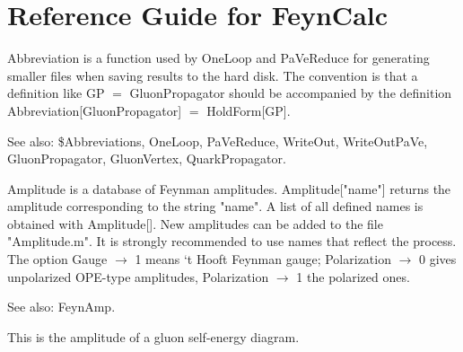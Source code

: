 \section{Reference Guide for FeynCalc}
\label{rg}
 



Abbreviation is a function used by OneLoop and PaVeReduce for generating smaller files when saving results to the hard disk. The
  convention is that a definition like GP \(=\) GluonPropagator should be accompanied by the definition Abbreviation[GluonPropagator]
  \(=\) HoldForm[GP].

See also: { }\${}Abbreviations, OneLoop, PaVeReduce, WriteOut, WriteOutPaVe, GluonPropagator, GluonVertex, QuarkPropagator.






Amplitude is a database of Feynman amplitudes. Amplitude["name"] returns the amplitude corresponding to the string "name". A list of all
  defined names is obtained with Amplitude[]. New amplitudes can be added to the file "Amplitude.m". It is strongly recommended to use
  names that reflect the process. The option Gauge \(\rightarrow \) 1 means `t Hooft Feynman gauge; Polarization \(\rightarrow \) 0 gives
  unpolarized OPE-type amplitudes, Polarization \(\rightarrow \) 1 the polarized ones.



See also:  FeynAmp.




This is the amplitude of a gluon self-energy diagram.


